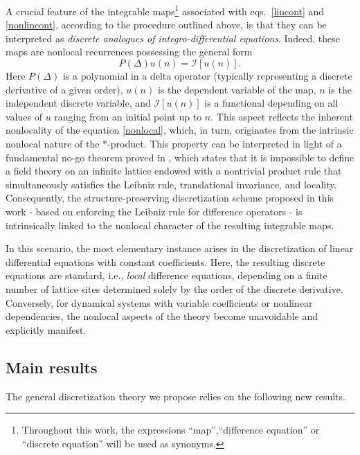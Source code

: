 \documentclass[10pt]{amsart}
\numberwithin{equation}{section}
\theoremstyle{definition}
\begin{document}
A crucial feature of the integrable maps\footnote{Throughout this work, the expressions ``map'',``difference equation'' or ``discrete equation'' will be used as synonyms.} associated with eqs.~\eqref{lincont} and \eqref{nonlincont}, according to the procedure outlined above, is that they can be interpreted as \textit{discrete analogues of integro-differential equations}. Indeed, these maps are nonlocal recurrences possessing the general form
\begin{equation}
P(\Delta ) u(n)=\mathcal{I}[u(n)]
\label{nonlocal}.
\end{equation}
Here $P(\Delta )$ is a polynomial in a delta operator (typically representing
a discrete derivative of a given order), $u(n)$ is the dependent variable
of the map, $n$ is the independent discrete variable, and
$\mathcal{I}[u(n)]$ is a functional depending on all values of $u$ ranging
from an initial point up to $n$. This aspect reflects the inherent nonlocality
of the equation \eqref{nonlocal}, which, in turn, originates from the intrinsic
nonlocal nature of the $*$-product. This property can be interpreted in
light of a fundamental no-go theorem proved in \cite{KSS}, which states
that it is impossible to define a field theory on an infinite lattice endowed
with a nontrivial product rule that simultaneously satisfies the Leibniz
rule, translational invariance, and locality. Consequently, the structure-preserving
discretization scheme proposed in this work - based on enforcing the Leibniz
rule for difference operators - is intrinsically linked to the nonlocal character of the resulting integrable maps.

In this scenario, the most elementary instance arises in the discretization
of linear differential equations with constant coefficients. Here, the
resulting discrete equations are standard, i.e., \textit{local} difference
equations, depending on a finite number of lattice sites determined solely
by the order of the discrete derivative. Conversely, for dynamical systems
with variable coefficients or nonlinear dependencies, the nonlocal aspects
of the theory become unavoidable and explicitly manifest.

\subsection{Main results}
\label{sec1.5}

The general discretization theory we propose relies on the following new
results.

\medskip
\end{document}
